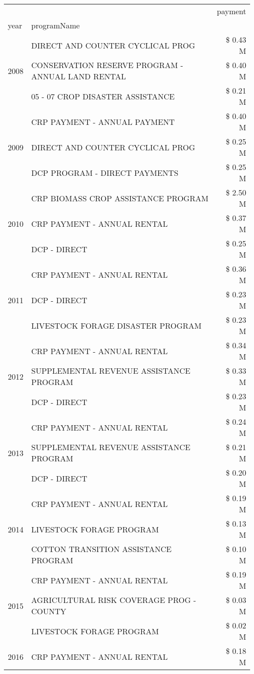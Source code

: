 \begin{tabular}{llr}
\toprule
 &  & payment \\
year & programName &  \\
\midrule
\multirow[t]{3}{*}{2008} & DIRECT AND COUNTER CYCLICAL PROG & \$ 0.43 M \\
 & CONSERVATION RESERVE PROGRAM - ANNUAL LAND RENTAL & \$ 0.40 M \\
 & 05 - 07 CROP DISASTER ASSISTANCE & \$ 0.21 M \\
\cline{1-3}
\multirow[t]{3}{*}{2009} & CRP PAYMENT - ANNUAL PAYMENT & \$ 0.40 M \\
 & DIRECT AND COUNTER CYCLICAL PROG & \$ 0.25 M \\
 & DCP PROGRAM - DIRECT PAYMENTS & \$ 0.25 M \\
\cline{1-3}
\multirow[t]{3}{*}{2010} & CRP BIOMASS CROP ASSISTANCE PROGRAM & \$ 2.50 M \\
 & CRP PAYMENT - ANNUAL RENTAL & \$ 0.37 M \\
 & DCP - DIRECT & \$ 0.25 M \\
\cline{1-3}
\multirow[t]{3}{*}{2011} & CRP PAYMENT - ANNUAL RENTAL & \$ 0.36 M \\
 & DCP - DIRECT & \$ 0.23 M \\
 & LIVESTOCK FORAGE DISASTER PROGRAM & \$ 0.23 M \\
\cline{1-3}
\multirow[t]{3}{*}{2012} & CRP PAYMENT - ANNUAL RENTAL & \$ 0.34 M \\
 & SUPPLEMENTAL REVENUE ASSISTANCE PROGRAM & \$ 0.33 M \\
 & DCP - DIRECT & \$ 0.23 M \\
\cline{1-3}
\multirow[t]{3}{*}{2013} & CRP PAYMENT - ANNUAL RENTAL & \$ 0.24 M \\
 & SUPPLEMENTAL REVENUE ASSISTANCE PROGRAM & \$ 0.21 M \\
 & DCP - DIRECT & \$ 0.20 M \\
\cline{1-3}
\multirow[t]{3}{*}{2014} & CRP PAYMENT - ANNUAL RENTAL & \$ 0.19 M \\
 & LIVESTOCK FORAGE PROGRAM & \$ 0.13 M \\
 & COTTON TRANSITION ASSISTANCE PROGRAM & \$ 0.10 M \\
\cline{1-3}
\multirow[t]{3}{*}{2015} & CRP PAYMENT - ANNUAL RENTAL & \$ 0.19 M \\
 & AGRICULTURAL RISK COVERAGE PROG - COUNTY & \$ 0.03 M \\
 & LIVESTOCK FORAGE PROGRAM & \$ 0.02 M \\
\cline{1-3}
\multirow[t]{3}{*}{2016} & CRP PAYMENT - ANNUAL RENTAL & \$ 0.18 M \\

\end{tabular}
